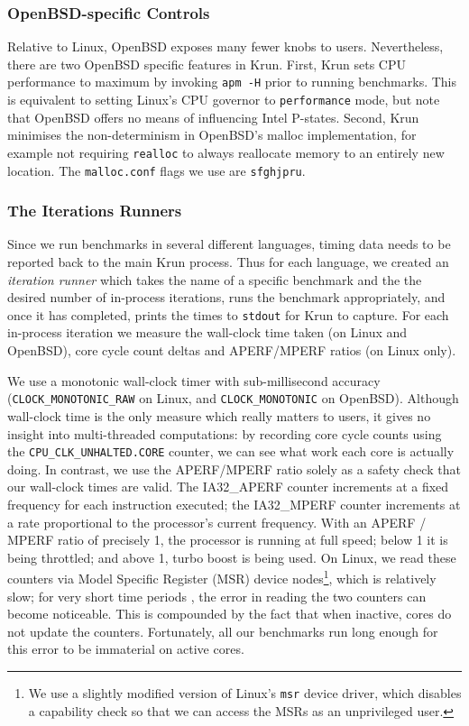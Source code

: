 \documentclass[preprint,numbers,10pt]{sigplanconf}
\newcommand{\krun}{Krun\xspace}
\begin{document}
\subsubsection{OpenBSD-specific Controls}

Relative to Linux, OpenBSD exposes many fewer knobs to users. Nevertheless,
there are two OpenBSD specific features in \krun.
First, \krun sets CPU performance to maximum by invoking \texttt{apm -H} prior
to running benchmarks. This is equivalent to setting Linux's CPU governor to
\texttt{performance} mode, but note that OpenBSD offers no means of influencing
Intel P-states.
Second, \krun minimises the non-determinism in OpenBSD's malloc implementation,
for example not requiring \texttt{realloc} to always reallocate memory to
an entirely new location. The \texttt{malloc.conf} flags we use are \texttt{sfghjpru}.


\subsubsection{The Iterations Runners}

Since we run benchmarks in several different languages, timing data needs
to be reported back to the main \krun process. Thus for each language, we created an
\emph{iteration runner} which takes the name of a specific benchmark and the
the desired number of in-process iterations, runs the benchmark appropriately,
and once it has completed, prints the times to \texttt{stdout} for \krun to
capture. For each in-process iteration we
measure the wall-clock time taken (on Linux and OpenBSD), core
cycle count deltas and APERF/MPERF ratios (on Linux only).

We use a monotonic wall-clock timer with sub-millisecond accuracy
(\texttt{CLOCK\_MONOTONIC\_RAW} on Linux, and \texttt{CLOCK\_MONOTONIC} on
OpenBSD). Although wall-clock time is the only measure which really matters to
users, it gives no insight into multi-threaded computations: by recording
core cycle counts using the \texttt{CPU\_CLK\_UNHALTED.CORE} counter, we can see
what work each core is actually doing. In contrast, we use the APERF/MPERF
ratio solely as a safety check that our wall-clock times are valid.
The IA32\_APERF counter increments at a fixed
frequency for each instruction executed; the IA32\_MPERF counter increments at a rate
proportional to the processor's current frequency. With an APERF / MPERF ratio of
precisely 1, the processor is running at full speed; below 1 it is being
throttled; and above 1, turbo boost is being used. On
Linux, we read these counters via Model Specific Register (MSR) device
nodes\footnote{We use a slightly modified version of Linux's \texttt{msr} device
driver, which disables a capability check so that we can access the MSRs as an
unprivileged user.}, which is relatively
slow; for very short time periods , the error in reading the two counters can become
noticeable. This is compounded by the fact that when inactive, cores do not
update the counters. Fortunately, all our benchmarks run long enough for this
error to be immaterial on active cores.
\end{document}
